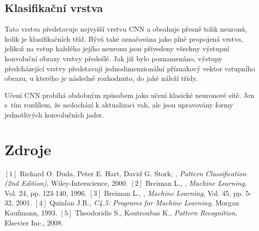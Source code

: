 {\subsection*{Klasifikační vrstva}
\par{Tato vrstva představuje nejvyšší vrstvu CNN a obsahuje přesně tolik neuronů, kolik je klasifikačních tříd. Bývá také označována jako plně propojená vrstva, jelikož na vstup každého jejího neuronu jsou přivedeny všechny výstupní konvoluční obrazy vrstvy předešlé. Jak již bylo poznamenáno, výstupy předcházející vrstvy představují jednodimenzionální příznakový vektor vstupního obrazu, u kterého je následně rozhodnuto, do jaké náleží třídy.}

\par{Učení CNN probíhá obdobným způsobem jako učení klasické neuronové sítě. Jen s~tím rozdílem, že nedochází k aktualizaci vah, ale jsou upravovány formy jednotlivých konvolučních jader.}









\newpage

\section{Zdroje}

\label{sec:08_References}
\par{$\left[1\right]$	Richard O. Duda, Peter E. Hart, David G. Stork, , \textit{Pattern Classification (2nd Edition)}, Wiley-Interscience, 2000.}
\newline
$\left[2\right]$	Breiman L., , \textit{Machine Learning}, Vol. 24, pp. 123-140, 1996.\newline
$\left[3\right]$	Breiman L., , \textit{Machine Learning}, Vol. 45, pp. 5-32, 2001.\newline
$\left[4\right]$	Quinlan J.R., \textit{C4.5: Programs for Machine Learning}, Morgan Kaufmann, 1993.\newline
$\left[5\right]$	Theodoridis S., Koutroubas K., \textit{Pattern Recognition}, Elsevier Inc., 2008.}





